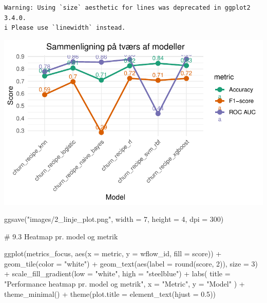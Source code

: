 \documentclass[
  11pt,
  letterpaper,
  DIV=11,
  numbers=noendperiod]{scrartcl}
\newenvironment{Shaded}{\begin{snugshade}}{\end{snugshade}}
\newcommand{\AttributeTok}[1]{\textcolor[rgb]{0.40,0.45,0.13}{#1}}
\newcommand{\CommentTok}[1]{\textcolor[rgb]{0.37,0.37,0.37}{#1}}
\newcommand{\DecValTok}[1]{\textcolor[rgb]{0.68,0.00,0.00}{#1}}
\newcommand{\FloatTok}[1]{\textcolor[rgb]{0.68,0.00,0.00}{#1}}
\newcommand{\FunctionTok}[1]{\textcolor[rgb]{0.28,0.35,0.67}{#1}}
\newcommand{\NormalTok}[1]{\textcolor[rgb]{0.00,0.23,0.31}{#1}}
\newcommand{\SpecialCharTok}[1]{\textcolor[rgb]{0.37,0.37,0.37}{#1}}
\newcommand{\StringTok}[1]{\textcolor[rgb]{0.13,0.47,0.30}{#1}}
\begin{document}
\begin{verbatim}
Warning: Using `size` aesthetic for lines was deprecated in ggplot2 3.4.0.
i Please use `linewidth` instead.
\end{verbatim}

\includegraphics{Quarto_files/figure-pdf/unnamed-chunk-12-2.pdf}

\begin{Shaded}
\begin{Highlighting}[]
\FunctionTok{ggsave}\NormalTok{(}\StringTok{"images/2\_linje\_plot.png"}\NormalTok{, }\AttributeTok{width =} \DecValTok{7}\NormalTok{, }\AttributeTok{height =} \DecValTok{4}\NormalTok{, }\AttributeTok{dpi =} \DecValTok{300}\NormalTok{)}


\CommentTok{\# 9.3 Heatmap pr. model og metrik}


\FunctionTok{ggplot}\NormalTok{(metrics\_focus, }\FunctionTok{aes}\NormalTok{(}\AttributeTok{x =}\NormalTok{ metric, }\AttributeTok{y =}\NormalTok{ wflow\_id, }\AttributeTok{fill =}\NormalTok{ score)) }\SpecialCharTok{+}
  \FunctionTok{geom\_tile}\NormalTok{(}\AttributeTok{color =} \StringTok{"white"}\NormalTok{) }\SpecialCharTok{+}
  \FunctionTok{geom\_text}\NormalTok{(}\FunctionTok{aes}\NormalTok{(}\AttributeTok{label =} \FunctionTok{round}\NormalTok{(score, }\DecValTok{2}\NormalTok{)), }\AttributeTok{size =} \DecValTok{3}\NormalTok{) }\SpecialCharTok{+}
  \FunctionTok{scale\_fill\_gradient}\NormalTok{(}\AttributeTok{low =} \StringTok{"white"}\NormalTok{, }\AttributeTok{high =} \StringTok{"steelblue"}\NormalTok{) }\SpecialCharTok{+}
  \FunctionTok{labs}\NormalTok{(}
    \AttributeTok{title =} \StringTok{"Performance heatmap pr. model og metrik"}\NormalTok{,}
    \AttributeTok{x =} \StringTok{"Metric"}\NormalTok{,}
    \AttributeTok{y =} \StringTok{"Model"}
\NormalTok{  ) }\SpecialCharTok{+}
  \FunctionTok{theme\_minimal}\NormalTok{() }\SpecialCharTok{+}
  \FunctionTok{theme}\NormalTok{(}\AttributeTok{plot.title =} \FunctionTok{element\_text}\NormalTok{(}\AttributeTok{hjust =} \FloatTok{0.5}\NormalTok{))}
\end{Highlighting}
\end{Shaded}
\end{document}
